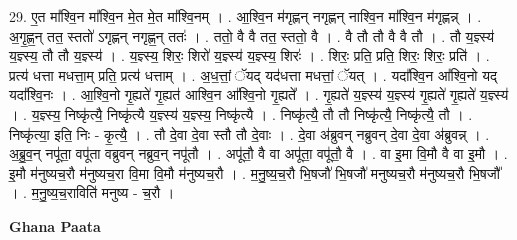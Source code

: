 \documentclass[17pt]{extarticle}
\begin{document}
29. ए॒त मा᳚श्वि॒न मा᳚श्वि॒न मे॒त मे॒त मा᳚श्वि॒नम् । . आ॒श्वि॒न म॑गृह्णन् नगृह्णन् नाश्वि॒न मा᳚श्वि॒न म॑गृह्णन्न् । . अ॒गृ॒ह्ण॒न् तत॒ स्ततो॑ ऽगृह्णन् नगृह्ण॒न् ततः॑ । . ततो॒ वै वै तत॒ स्ततो॒ वै । . वै तौ तौ वै वै तौ । . तौ य॒ज्ञ्स्य॑ य॒ज्ञ्स्य॒ तौ तौ य॒ज्ञ्स्य॑ । . य॒ज्ञ्स्य॒ शिरः॒ शिरो॑ य॒ज्ञ्स्य॑ य॒ज्ञ्स्य॒ शिरः॑ । . शिरः॒ प्रति॒ प्रति॒ शिरः॒ शिरः॒ प्रति॑ । . प्रत्य॑ धत्ता मधत्ता॒म् प्रति॒ प्रत्य॑ धत्ताम् । . अ॒ध॒त्तां॒ ॅयद् यद॑धत्ता मधत्तां॒ ॅयत् । . यदा᳚श्वि॒न आ᳚श्वि॒नो यद् यदा᳚श्वि॒नः । . आ॒श्वि॒नो गृ॒ह्यते॑ गृ॒ह्यत॑ आश्वि॒न आ᳚श्वि॒नो गृ॒ह्यते᳚ । . गृ॒ह्यते॑ य॒ज्ञ्स्य॑ य॒ज्ञ्स्य॑ गृ॒ह्यते॑ गृ॒ह्यते॑ य॒ज्ञ्स्य॑ । . य॒ज्ञ्स्य॒ निष्कृ॑त्यै॒ निष्कृ॑त्यै य॒ज्ञ्स्य॑ य॒ज्ञ्स्य॒ निष्कृ॑त्यै । . निष्कृ॑त्यै॒ तौ तौ निष्कृ॑त्यै॒ निष्कृ॑त्यै॒ तौ । . निष्कृ॑त्या॒ इति॒ निः - कृ॒त्यै॒ । . तौ दे॒वा दे॒वा स्तौ तौ दे॒वाः । . दे॒वा अ॑ब्रुवन् नब्रुवन् दे॒वा दे॒वा अ॑ब्रुवन्न् । . अ॒ब्रु॒व॒न् नपू॑ता॒ वपू॑ता वब्रुवन् नब्रुव॒न् नपू॑तौ । . अपू॑तौ॒ वै वा अपू॑ता॒ वपू॑तौ॒ वै । . वा इ॒मा वि॒मौ वै वा इ॒मौ । . इ॒मौ म॑नुष्यच॒रौ म॑नुष्यच॒रा वि॒मा वि॒मौ म॑नुष्यच॒रौ । . म॒नु॒ष्य॒च॒रौ भि॒षजौ॑ भि॒षजौ॑ मनुष्यच॒रौ म॑नुष्यच॒रौ भि॒षजौ᳚ । . म॒नु॒ष्य॒च॒राविति॑ मनुष्य - च॒रौ । \newline

\textbf{Ghana Paata } \newline
\end{document}
